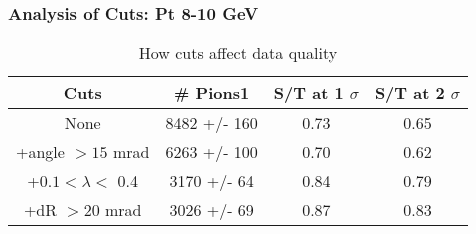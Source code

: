 \frame
{
\frametitle{Analysis of Cuts: Pt  8-10 GeV}
\begin{table}
\caption{How cuts affect data quality}
\centering
\begin{tabular}{c c c c}
\hline\hline
Cuts & \# Pions1 & S/T at 1 $\sigma$ & S/T at 2 $\sigma$ \\ [0.5ex]
\hline
None & 8482 +/-  160 & 0.73 & 0.65 \\ %
+angle $> 15$ mrad & 6263 +/-  100 & 0.70 & 0.62 \\ %
+$0.1 < \lambda <$ 0.4 & 3170 +/-   64 & 0.84 & 0.79 \\ %
+dR $> 20$ mrad & 3026 +/-   69 & 0.87 & 0.83 \\ %
[1ex]
\hline
\end{tabular}
\label{table:nonlin}
\end{table}
}
